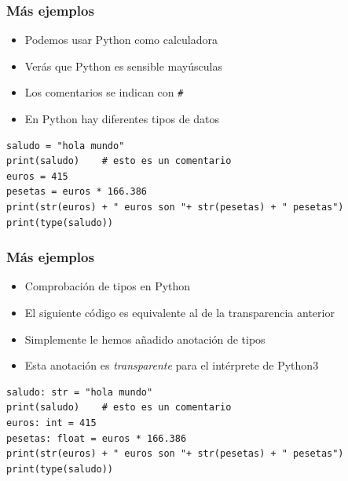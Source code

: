 \begin{frame}[fragile]

\frametitle{Más ejemplos}

\begin{itemize}
\item Podemos usar Python como calculadora

\item Verás que Python es sensible mayúsculas

\item Los comentarios se indican con \verb=#=

\item En Python hay diferentes tipos de datos

\end{itemize}

\begin{footnotesize}
\begin{verbatim}
saludo = "hola mundo"
print(saludo)    # esto es un comentario
euros = 415
pesetas = euros * 166.386
print(str(euros) + " euros son "+ str(pesetas) + " pesetas")
print(type(saludo))
\end{verbatim}
\end{footnotesize}

\end{frame}



\begin{frame}[fragile]

\frametitle{Más ejemplos}

\begin{itemize}

\item Comprobación de tipos en Python

\item El siguiente código es equivalente al de la transparencia anterior

\item Simplemente le hemos añadido anotación de tipos

\item Esta anotación es \emph{transparente} para el intérprete de Python3

\end{itemize}

\begin{footnotesize}
\begin{verbatim}
saludo: str = "hola mundo"
print(saludo)    # esto es un comentario
euros: int = 415
pesetas: float = euros * 166.386
print(str(euros) + " euros son "+ str(pesetas) + " pesetas")
print(type(saludo))
\end{verbatim}
\end{footnotesize}

\end{frame}



